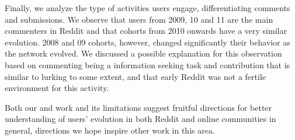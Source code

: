 Finally, we analyze the type of activities users engage, differentiating comments and submissions. We observe that users from 2009, 10 and 11 are the main commenters in Reddit and that cohorts from 2010 onwards have a very similar evolution. 2008 and 09 cohorts, however, changed significantly their behavior as the network evolved.  We discussed a possible explanation for this observation based on commenting being a information seeking task and contribution  that is similar to lurking to some extent, and that early Reddit was not a fertile environment for this activity.

Both our and work and its limitations suggest fruitful directions for better understanding of users' evolution in both Reddit and online communities in general, directions we hope inspire other work in this area.  



%



